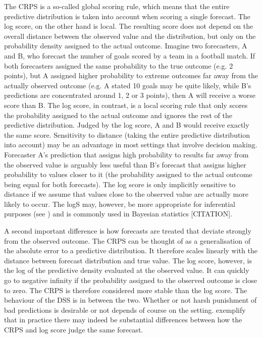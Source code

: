 \documentclass[article,shortnames]{jss}\usepackage[]{graphicx}\usepackage[]{color}
\begin{document}
The CRPS is a so-called global scoring rule, which means that the entire predictive distribution is taken into account when scoring a single forecast. The log score, on the other hand is local. The resulting score does not depend on the overall distance between the observed value and the distribution, but only on the probability density assigned to the actual outcome. Imagine two forecasters, A and B, who forecast the number of goals scored by a team in a football match. If both forecasters assigned the same probability to the true outcome (e.g. 2 points), but A assigned higher probability to extreme outcomes far away from the actually observed outcome (e.g. A stated 10 goals may be quite likely, while B's predictions are concentrated around 1, 2 or 3 points), then A will receive a worse score than B. The log score, in contrast, is a local scoring rule that only scores the probability assigned to the actual outcome and ignores the rest of the predictive distribution. Judged by the log score, A and B would receive exactly the same score. Sensitivity to distance (taking the entire predictive distribution into account) may be an advantage in most settings that involve decision making. Forecaster A's prediction that assigns high probability to results far away from the observed value is arguably less useful than B's forecast that assigns higher probability to values closer to it (the probability assigned to the actual outcome being equal for both forecasts). The log score is only implicitly sensitive to distance if we assume that values close to the observed value are actually more likely to occur. The logS may, however, be more appropriate for inferential purposes (see \cite{winklerScoringRulesEvaluation1996}) and is commonly used in Bayesian statistics [CITATION]. 

A second important difference is how forecasts are treated that deviate strongly from the observed outcome. The CRPS can be thought of as a generalisation of the absolute error to a predictive distribution. It therefore scales linearly with the distance between forecast distribution and true value. The log score, however, is the log of the predictive density evaluated at the observed value. It can quickly go to negative infinity if the probability assigned to the observed outcome is close to zero. The CRPS is therefore considered more stable than the log score. The behaviour of the DSS is in between the two. Whether or not harsh punishment of bad predictions is desirable or not depends of course on the setting. \cite{bracherEvaluatingEpidemicForecasts2021} exemplify that in practice there may indeed be substantial differences between how the CRPS and log score judge the same forecast. 
\end{document}
